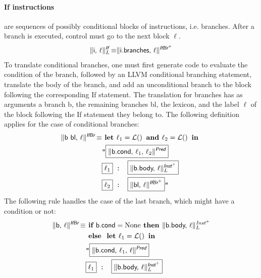 \documentclass{llncs}
\newcommand{\trad}[2]{\ensuremath{\lVert \textsf{#1} \rVert^{\textit{#2}}}}
\DeclareMathOperator{\isdef}{\equiv}
\DeclareMathOperator{\name}{\mathcal{L}()}
\newcommand{\llvm}[1]{\texttt{#1}}
\newcommand{\B}[1]{\textsf{#1}}
\newcommand{\ListOf}[1]{$\mbox{#1}^+$}
\newcommand{\IF}[0]{\textbf{ if }}
\newcommand{\ELSE}[0]{\textbf{ else }}
\newcommand{\THEN}[0]{\textbf{ then }}
\newcommand{\LET}[0]{\textbf{ let }}
\newcommand{\IN}[0]{\textbf{ in }}
\newcommand{\AND}[0]{\textbf{ and }}
\newcommand{\PH}[1]{\framebox{$#1$}}
\begin{document}
\paragraph{If instructions} are sequences of possibly conditional blocks of
instructions, i.e. branches. After a branch is executed, control must go
to the next block $\ell$.
\begin{align*}
  \trad{i, $\ell$}{\B{If}}_L \isdef \trad{i.branches, $\ell$}{\ListOf{\B{IfBr}}}
\end{align*}
To translate conditional branches, one must first generate code to evaluate the
condition of the branch, followed by an LLVM conditional branching statement,
translate the body of the branch, and add an unconditional branch to the block
following the corresponding \B{If} statement.  The translation for branches has
as arguments a branch \B{b}, the remaining branches \B{bl}, the lexicon, and the
label $\ell$ of the block following the \B{If} statement they belong to. The
following definition applies for the case of conditional branches:
\begin{align*}
\begin{split}
  \trad{\B{b bl}, $\ell$}{\B{IfBr}} \isdef & \LET \ell_1 = \name \AND \ell_2 = \name \IN \\
  & \llvm{"\PH{\trad{b.cond, $\ell_1$, $\ell_2$}{\B{Pred}}} } \\
  & \llvm{\PH{\ell_1} : \PH{\trad{b.body, $\ell$}{\ListOf{\B{Inst}}}_L}} \\
  & \llvm{\PH{\ell_2} : \PH{\trad{bl, $\ell$}{\ListOf{\B{IfBr}}}}"} \\
\end{split}
\end{align*}
The following rule handles the case of the last branch, which might have a condition or not:
\begin{align*}
\begin{split}
  \trad{\B{b}, $\ell$}{\B{IfBr}} \isdef & \IF \B{b.cond} = \text{None} \THEN
  \trad{b.body, $\ell$}{\ListOf{Inst}}_L\\
  & \ELSE \LET \ell_1 = \name \IN \\
  & \llvm{"\PH{\trad{b.cond, $\ell_1$, $\ell$}{\B{Pred}}} } \\
  & \llvm{\PH{\ell_1} : \PH{\trad{b.body, $\ell$}{\ListOf{\B{Inst}}}_L}}
\end{split}
\end{align*}
\end{document}
